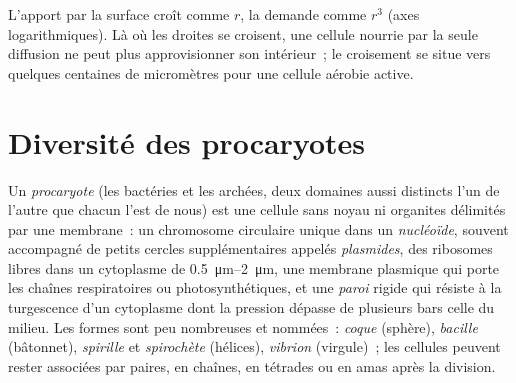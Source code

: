 \begin{omfigure}

{\small L'apport par la surface croît comme $r$, la demande comme
$r^3$ (axes logarithmiques). Là où les droites se croisent, une cellule
nourrie par la seule diffusion ne peut plus approvisionner son
intérieur~; le croisement se situe vers quelques centaines de
micromètres pour une cellule aérobie active.}
\end{omfigure}

\section{Diversité des procaryotes}

\begin{definition}\label{def:b2:unicellular-diversity:prokaryote}
Un \emph{procaryote} (les bactéries et les archées,
deux domaines aussi distincts l'un de l'autre que chacun l'est de nous)
est une cellule sans noyau ni organites délimités par une membrane~: un
chromosome circulaire unique dans un \emph{nucléoïde},
souvent accompagné de petits cercles supplémentaires appelés
\emph{plasmides}, des ribosomes libres dans un cytoplasme
de \qtyrange{0.5}{2}{\micro m}, une membrane plasmique qui porte les
chaînes respiratoires ou photosynthétiques, et une \emph{paroi}
rigide qui résiste à la turgescence d'un cytoplasme dont la pression
dépasse de plusieurs bars celle du milieu. Les formes sont peu nombreuses
et nommées~: \emph{coque} (sphère), \emph{bacille} (bâtonnet),
\emph{spirille} et \emph{spirochète} (hélices), \emph{vibrion}
(virgule)~; les cellules peuvent rester associées par paires, en
chaînes, en tétrades ou en amas après la division.
\end{definition}

